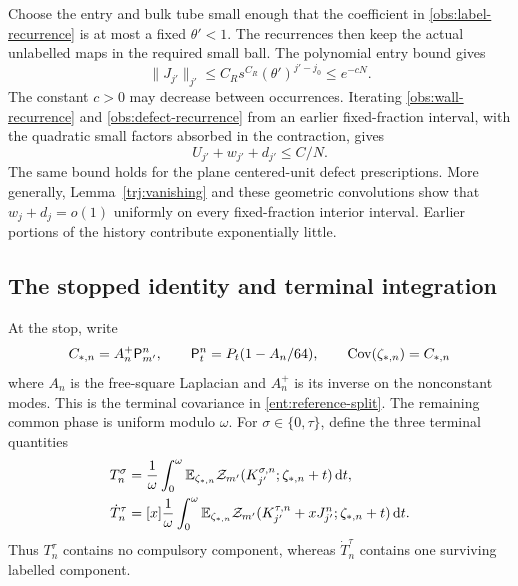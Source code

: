 Choose the entry and bulk tube small enough that the coefficient
in \eqref{obs:label-recurrence} is at most a fixed \(\theta'<1\).
The recurrences then keep the actual unlabelled maps in the required
small ball.  The polynomial entry bound gives
\begin{equation}\label{obs:label-stop}
 \|J_{j'}\|_{j'}\le C_Rs^{C_R}(\theta')^{j'-j_0}
                       \le e^{-cN}.
\end{equation}
The constant \(c>0\) may decrease between occurrences.  Iterating
\eqref{obs:wall-recurrence} and \eqref{obs:defect-recurrence} from
an earlier fixed-fraction interval, with the quadratic small
factors absorbed in the contraction, gives
\begin{equation}\label{obs:unlabelled-stop}
        U_{j'}+w_{j'}+d_{j'}\le C/N.
\end{equation}
The same bound holds for the plane centered-unit defect prescriptions.
More generally, Lemma~\ref{trj:vanishing} and these geometric
convolutions show that \(w_j+d_j=o(1)\) uniformly on every
fixed-fraction interior interval.  Earlier portions of the history
contribute exponentially little.

\subsection{The stopped identity and terminal integration}

At the stop, write
\[
 C_{*,n}=A_n^+\mathsf P_{m'}^n,\qquad
 \mathsf P_t^n=P_t(1-A_n/64),\qquad
 \operatorname{Cov}(\zeta_{*,n})=C_{*,n}
\]
where \(A_n\) is the free-square Laplacian and \(A_n^+\) is its
inverse on the nonconstant modes.  This is the terminal covariance in \eqref{ent:reference-split}.  The remaining common
phase is uniform modulo \(\omega\).  For \(\sigma\in\{0,\tau\}\),
define the three terminal quantities
\begin{equation}\label{obs:terminal-quantities}
\begin{split}
 T_n^\sigma
   &=\frac1\omega\int_0^\omega
       \mathbb E_{\zeta_{*,n}}
       \mathcal Z_{m'}(K_{j'}^{\sigma,n};\zeta_{*,n}+t)\,\mathrm d t,\\
 \dot T_n^\tau
   &=[x]\frac1\omega\int_0^\omega
       \mathbb E_{\zeta_{*,n}}
       \mathcal Z_{m'}(K_{j'}^{\tau,n}+xJ_{j'}^n;
                                  \zeta_{*,n}+t)\,\mathrm d t.
\end{split}
\end{equation}
Thus \(T_n^\tau\) contains no compulsory component, whereas
\(\dot T_n^\tau\) contains one surviving labelled component.

